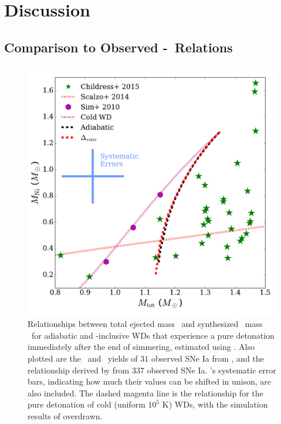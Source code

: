 \section{Discussion}
\label{sec:c5_discussion}

\subsection{Comparison to Observed \Mtot-\MNi\ Relations}
\label{ssec:c5_comparetoobs}

\begin{figure}
\centering
\includegraphics[angle=0,width=1.0\columnwidth]{chapter5_zhu+16/figures/mni.pdf}
\caption{Relationships between total ejected mass \Mtot\ and synthesized \Ni\ mass \MNi\ for adiabatic and \dnabconv-inclusive WDs that experience a pure detonation immediately after the end of simmering, estimated using \cite{sim+10}.  Also plotted are the \Mtot\ and \MNi\ yields of $31$ observed SNe Ia from \cite{chil+15}, and the relationship derived by \cite{scalzrs14} from 337 observed SNe Ia.  \cite{chil+15}'s systematic error bars, indicating how much their values can be shifted in unison, are also included.  The dashed magenta line is the relationship for the pure detonation of cold (uniform $10^5$ K) WDs, with the simulation results of \cite{sim+10} overdrawn.}
\label{fig:c5_mni}
\end{figure}

